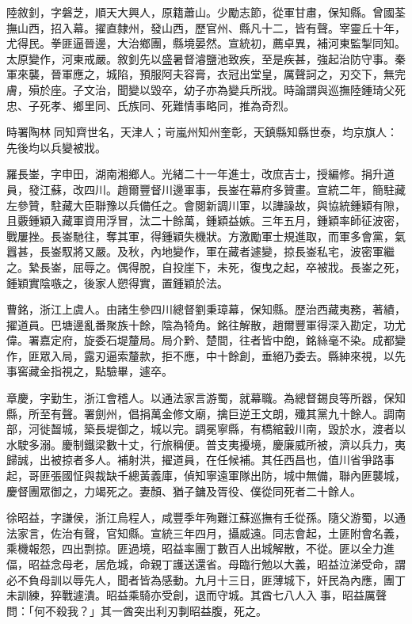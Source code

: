 \begin{pinyinscope}
陸敘釗，字磐芝，順天大興人，原籍蕭山。少勵志節，從軍甘肅，保知縣。曾國荃撫山西，招入幕。擢直隸州，發山西，歷官州、縣凡十二，皆有聲。宰靈丘十年，尤得民。拳匪逼晉邊，大治鄉團，縣境晏然。宣統初，薦卓異，補河東監掣同知。太原變作，河東戒嚴。敘釗先以盛暑督濬鹽池致疾，至是疾甚，強起治防守事。秦軍來襲，晉軍應之，城陷，預服阿夫容膏，衣冠出堂皇，厲聲訶之，刃交下，無完膚，殞於座。子文治，聞變以毀卒，幼子亦為變兵所戕。時論謂與巡撫陸鍾琦父死忠、子死孝、鄉里同、氏族同、死難情事略同，推為奇烈。

時署陶林同知齊世名，天津人；岢嵐州知州奎彰，天鎮縣知縣世泰，均京旗人：先後均以兵變被戕。

羅長崟，字申田，湖南湘鄉人。光緒二十一年進士，改庶吉士，授編修。捐升道員，發江蘇，改四川。趙爾豐督川邊軍事，長崟在幕府多贊畫。宣統二年，簡駐藏左參贊，駐藏大臣聯豫以兵備任之。會閱新調川軍，以譁譟故，與協統鍾穎有隙，且覈鍾穎入藏軍資用浮冒，汰二十餘萬，鍾穎益嫉。三年五月，鍾穎率師征波密，戰屢挫。長崟馳往，奪其軍，得鍾穎失機狀。方激勵軍士規進取，而軍多會黨，氣囂甚，長崟馭將又嚴。及秋，內地變作，軍在藏者遽變，掠長崟私宅，波密軍繼之。縶長崟，屈辱之。偶得脫，自投崖下，未死，復曳之起，卒被戕。長崟之死，鍾穎實陰嗾之，後家人愬得實，置鍾穎於法。

曹銘，浙江上虞人。由諸生參四川總督劉秉璋幕，保知縣。歷治西藏夷務，著績，擢道員。巴塘邊亂番聚族十餘，陰為犄角。銘往解散，趙爾豐軍得深入勘定，功尤偉。署嘉定府，旋委石堤釐局。局介黔、楚間，往者皆中飽，銘絲毫不染。成都變作，匪眾入局，露刃逼索釐款，拒不應，中十餘創，垂絕乃委去。縣紳來視，以先事窖藏金指視之，點驗畢，遽卒。

章慶，字勤生，浙江會稽人。以通法家言游蜀，就幕職。為總督錫良等所器，保知縣，所至有聲。署劍州，倡捐萬金修文廟，擒巨逆王文朗，殲其黨九十餘人。調南部，河徙齧城，築長堤御之，城以完。調冕寧縣，有橋綰轂川南，毀於水，渡者以水駛多溺。慶制鐵梁數十丈，行旅稱便。普支夷擾境，慶廉威所被，濟以兵力，夷歸誠，出被掠者多人。補射洪，擢道員，在任候補。其任西昌也，值川省爭路事起，哥匪張國怔與裁缺千總黃義庫，偵知寧遠軍隊出防，城中無備，聯內匪襲城，慶督團眾御之，力竭死之。妻顏、猶子鏞及胥役、僕從同死者二十餘人。

徐昭益，字謙侯，浙江烏程人，咸豐季年殉難江蘇巡撫有壬從孫。隨父游蜀，以通法家言，佐治有聲，官知縣。宣統三年四月，攝威遠。同志會起，土匪附會名義，乘機報怨，四出剽掠。匪過境，昭益率團丁數百人出城解散，不從。匪以全力進偪，昭益念母老，居危城，命親丁護送還省。母臨行勉以大義，昭益泣涕受命，謂必不負母訓以辱先人，聞者皆為感動。九月十三日，匪薄城下，奸民為內應，團丁未訓練，猝戰遽潰。昭益乘騎亦受創，退而守城。其酋七八人入事，昭益厲聲問：「何不殺我？」其一酋突出利刃剚昭益腹，死之。


\end{pinyinscope}
